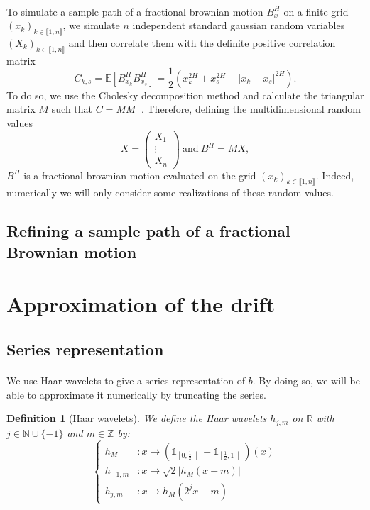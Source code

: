 \documentclass[11pt]{enstaPRE}
\newtheorem{defi}{Definition}
\newcommand{\R}{\mathbb{R}}
\newcommand{\Z}{\mathbb{Z}}
\newcommand{\N}{\mathbb{N}}
\newcommand{\E}{\mathbb{E}}
\begin{document}
\paragraph{}
To simulate a sample path of a fractional brownian motion $B^H_x$ on a finite grid $(x_k)_{k\in\llbracket1,n\rrbracket}$, we simulate $n$ independent standard gaussian random variables $(X_k)_{k\in\llbracket1,n\rrbracket}$ and then correlate them with the definite positive correlation matrix 
$$C_{k,s}=\E\left[B_{x_k}^HB_{x_s}^H\right]=\frac{1}{2}\left(x_k^{2H}+x_s^{2H}+|x_k-x_s|^{2H}\right).$$
To do so, we use the Cholesky decomposition method and calculate the triangular matrix $M$ such that $C=MM^\top$. Therefore, defining the multidimensional random values
$$X = \begin{pmatrix}
X_1 \\ \vdots \\ X_n
\end{pmatrix}\ \mathrm{and}\ B^H = MX,$$
$B^H$ is a fractional brownian motion evaluated on the grid $(x_k)_{k\in\llbracket1,n\rrbracket}$. Indeed, numerically we will only consider some realizations of these random values. 

\subsection{Refining a sample path of a fractional Brownian motion}

\section{Approximation of the drift}
\subsection{Series representation}
\paragraph{}
We use Haar wavelets to give a series representation of $b$. By doing so, we will be able to approximate it numerically by truncating the series.

\begin{defi}[Haar wavelets]
    We define the Haar wavelets $h_{j,m}$ on $\R$ with $j\in\N\cup\{-1\}$ and $m\in\Z$ by:
    $$\begin{cases}
    h_M&:x\longmapsto\left(\mathds{1}_{\left[0,\frac{1}{2}\right[}-\mathds{1}_{\left[\frac{1}{2},1\right[}\right)(x)\\ h_{-1,m}&:x\longmapsto\sqrt{2}|h_M(x-m)|\\
    h_{j,m}&:x\longmapsto h_M(2^jx-m) 
    \end{cases}$$
\end{defi}
\end{document}
